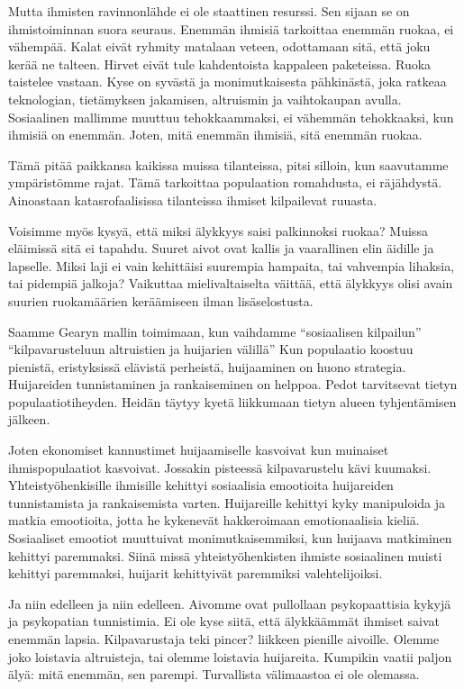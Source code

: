 Mutta ihmisten ravinnonlähde ei ole staattinen resurssi. Sen sijaan se on ihmistoiminnan suora seuraus. Enemmän ihmisiä tarkoittaa enemmän ruokaa, ei vähempää. Kalat eivät ryhmity matalaan veteen, odottamaan sitä, että joku kerää ne talteen. Hirvet eivät tule kahdentoista kappaleen paketeissa. Ruoka taistelee vastaan. Kyse on syvästä ja monimutkaisesta pähkinästä, joka ratkeaa teknologian, tietämyksen jakamisen, altruismin ja vaihtokaupan avulla. Sosiaalinen mallimme muuttuu tehokkaammaksi, ei vähemmän tehokkaaksi, kun ihmisiä on enemmän. Joten, mitä enemmän ihmisiä, sitä enemmän ruokaa.

Tämä pitää paikkansa kaikissa muissa tilanteissa, pitsi silloin, kun saavutamme ympäristömme rajat. Tämä tarkoittaa populaation romahdusta, ei räjähdystä. Ainoastaan katasrofaalisissa tilanteissa ihmiset kilpailevat ruuasta.

Voisimme myös kysyä, että miksi älykkyys saisi palkinnoksi ruokaa? Muissa eläimissä sitä ei tapahdu. Suuret aivot ovat kallis ja vaarallinen elin äidille ja lapselle. Miksi laji ei vain kehittäisi suurempia hampaita, tai vahvempia lihaksia, tai pidempiä jalkoja? Vaikuttaa mielivaltaiselta väittää, että älykkyys olisi avain suurien ruokamäärien keräämiseen ilman lisäselostusta.

Saamme Gearyn mallin toimimaan, kun vaihdamme ``sosiaalisen kilpailun'' ``kilpavarusteluun altruistien ja huijarien välillä'' Kun populaatio koostuu pienistä, eristyksissä elävistä perheistä, huijaaminen on huono strategia. Huijareiden tunnistaminen ja rankaiseminen on helppoa. Pedot tarvitsevat tietyn populaatiotiheyden. Heidän täytyy kyetä liikkumaan tietyn alueen tyhjentämisen jälkeen.

Joten ekonomiset kannustimet huijaamiselle kasvoivat kun muinaiset ihmispopulaatiot kasvoivat. Jossakin pisteessä kilpavarustelu kävi kuumaksi. Yhteistyöhenkisille ihmisille kehittyi sosiaalisia emootioita huijareiden tunnistamista ja rankaisemista varten. Huijareille kehittyi kyky manipuloida ja matkia emootioita, jotta he kykenevät hakkeroimaan emotionaalisia kieliä. Sosiaaliset emootiot muuttuivat monimutkaisemmiksi, kun huijaava matkiminen kehittyi paremmaksi. Siinä missä yhteistyöhenkisten ihmiste sosiaalinen muisti kehittyi paremmaksi, huijarit kehittyivät paremmiksi valehtelijoiksi.

Ja niin edelleen ja niin edelleen. Aivomme ovat pullollaan psykopaattisia kykyjä ja psykopatian tunnistimia. Ei ole kyse siitä, että älykkäämmät ihmiset saivat enemmän lapsia. Kilpavarustaja teki pincer? liikkeen pienille aivoille. Olemme joko loistavia altruisteja, tai olemme loistavia huijareita. Kumpikin vaatii paljon älyä: mitä enemmän, sen parempi. Turvallista välimaastoa ei ole olemassa.

